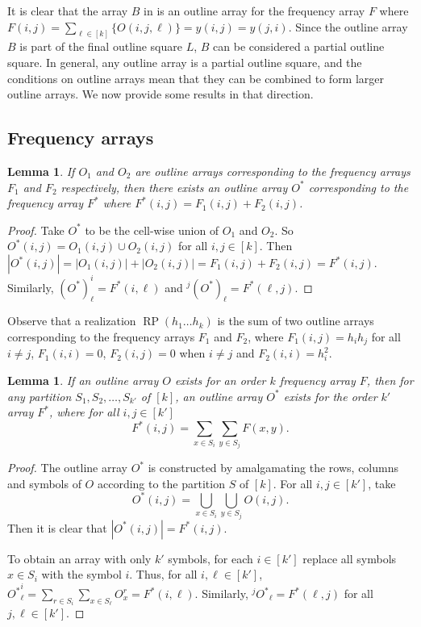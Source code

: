 \documentclass[preprint,nonatbib]{elsarticle}
\DeclareMathOperator{\LS}{RP}
\newtheorem{lemma}[theorem]{Lemma}
\theoremstyle{definition}
\numberwithin{equation}{section}
\begin{document}
It is clear that the array $B$ in  is an outline array for the frequency array $F$ where $F(i,j) = \sum_{\ell\in[k]} \{O(i,j,
\ell)\} = y(i,j) = y(j,i)$. Since the outline array $B$ is part of the final outline square $L$, $B$ can be considered a partial outline square. In general, any outline array is a partial outline square, and the conditions on outline arrays mean that they can be combined to form larger outline arrays. We now provide some results in that direction.




\subsection{Frequency arrays}

\begin{lemma}
\label{lemma: sum freq arrays}
    If $O_1$ and $O_2$ are outline arrays corresponding to the frequency arrays $F_1$ and $F_2$ respectively, then there exists an outline array $O^*$ corresponding to the frequency array $F^*$ where $F^*(i,j) = F_1(i,j) + F_2(i,j)$.
\end{lemma}
\begin{proof}
    Take $O^*$ to be the cell-wise union of $O_1$ and $O_2$. So $O^*(i,j) = O_1(i,j)\cup O_2(i,j)$ for all $i,j\in[k]$. Then $|O^*(i,j)| = |O_1(i,j)| + |O_2(i,j)| = F_1(i,j) + F_2(i,j) = F^*(i,j)$. Similarly, $(O^*)_\ell^i = F^*(i,\ell)$ and $^j(O^*)_\ell = F^*(\ell,j)$.
\end{proof}

Observe that a realization $\LS(h_1\dots h_k)$ is the sum of two outline arrays corresponding to the frequency arrays $F_1$ and $F_2$, where $F_1(i,j) = h_ih_j$ for all $i\neq j$, $F_1(i,i) = 0$, $F_2(i,j) = 0$ when $i\neq j$ and $F_2(i,i) = h_i^2$.

\begin{lemma}
\label{lemma: summing rows/columns of outline array}
    If an outline array $O$ exists for an order $k$ frequency array $F$, then for any partition $S_1,S_2,\dots,S_{k'}$ of $[k]$, an outline array $O^*$ exists for the order $k'$ array $F^*$, where for all $i,j\in[k']$ $$F^*(i,j) = \sum_{x\in S_i}\sum_{y\in S_j}F(x,y).$$
\end{lemma}
\begin{proof}
    The outline array $O^*$ is constructed by amalgamating the rows, columns and symbols of $O$ according to the partition $S$ of $[k]$. For all $i,j\in[k']$, take $$O^*(i,j) = \bigcup_{x\in S_i}\bigcup_{y\in S_j} O(i,j).$$
    Then it is clear that $|O^*(i,j)| = F^*(i,j)$.

    To obtain an array with only $k'$ symbols, for each $i\in[k']$ replace all symbols $x\in S_i$ with the symbol $i$. Thus, for all $i,\ell\in [k']$, ${O^*}_\ell^i = \sum_{r\in S_i}\sum_{x\in S_\ell}O_x^r = F^*(i,\ell)$. Similarly, $^j{O^*}_\ell = F^*(\ell,j)$ for all $j,\ell\in[k']$.
\end{proof}
\end{document}
